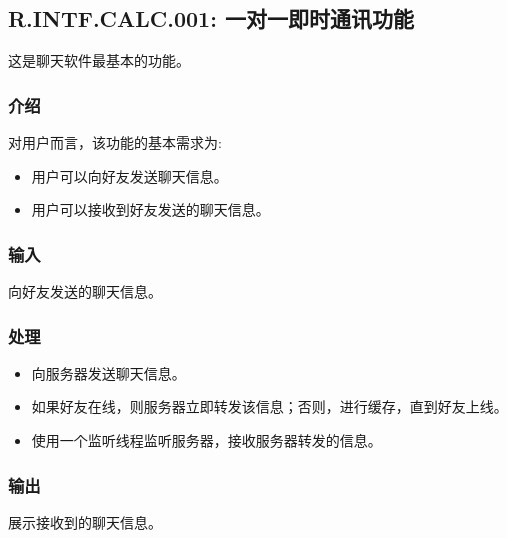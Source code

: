\subsection{R.INTF.CALC.001: 一对一即时通讯功能}
这是聊天软件最基本的功能。
\subsubsection{介绍}
对用户而言，该功能的基本需求为:
\begin{itemize}
  \item 用户可以向好友发送聊天信息。
  \item 用户可以接收到好友发送的聊天信息。
\end{itemize}
\subsubsection{输入}
向好友发送的聊天信息。
\subsubsection{处理}
\begin{itemize}
  \item 向服务器发送聊天信息。
  \item 如果好友在线，则服务器立即转发该信息；否则，进行缓存，直到好友上线。
  \item 使用一个监听线程监听服务器，接收服务器转发的信息。
\end{itemize}
\subsubsection{输出}
展示接收到的聊天信息。